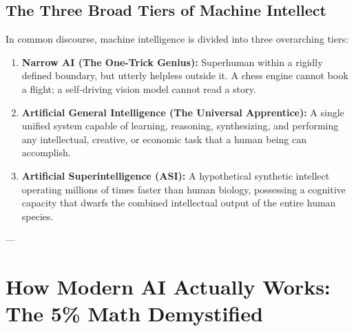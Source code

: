 \documentclass[11pt,journal,onecolumn]{IEEEtran}
\begin{document}
\subsection{The Three Broad Tiers of Machine Intellect}
In common discourse, machine intelligence is divided into three overarching tiers:
\begin{enumerate}
    \item \textbf{Narrow AI (The One-Trick Genius):} Superhuman within a rigidly defined boundary, but utterly helpless outside it. A chess engine cannot book a flight; a self-driving vision model cannot read a story.
    \item \textbf{Artificial General Intelligence (The Universal Apprentice):} A single unified system capable of learning, reasoning, synthesizing, and performing any intellectual, creative, or economic task that a human being can accomplish.
    \item \textbf{Artificial Superintelligence (ASI):} A hypothetical synthetic intellect operating millions of times faster than human biology, possessing a cognitive capacity that dwarfs the combined intellectual output of the entire human species.
\end{enumerate}

\vspace{0.3em}
\noindent{}

---

\section{How Modern AI Actually Works: The 5\% Math Demystified}
\label{sec:mechanics}
\end{document}
